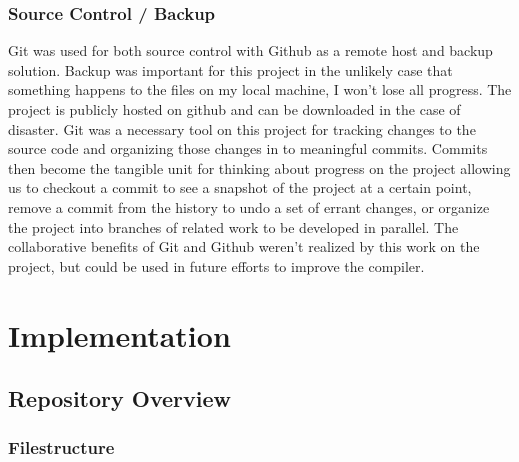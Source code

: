 \documentclass[12pt,a4paper,twoside,openright]{report}
\begin{document}
\subsection{Source Control / Backup}
Git was used for both source control with Github as a remote host and backup solution.
Backup was important for this project in the unlikely case that something happens to the files on my local machine, I won't lose all progress.
The project is publicly hosted on github and can be downloaded in the case of disaster.
Git was a necessary tool on this project for tracking changes to the source code and organizing those changes in to meaningful commits.
Commits then become the tangible unit for thinking about progress on the project allowing us to checkout a commit to see a snapshot of the project at a certain point, remove a commit from the history to undo a set of errant changes, or organize the project into branches of related work to be developed in parallel.
The collaborative benefits of Git and Github weren't realized by this work on the project, but could be used in future efforts to improve the compiler.

\chapter{Implementation}

\section{Repository Overview}
\subsection{Filestructure}
\end{document}
